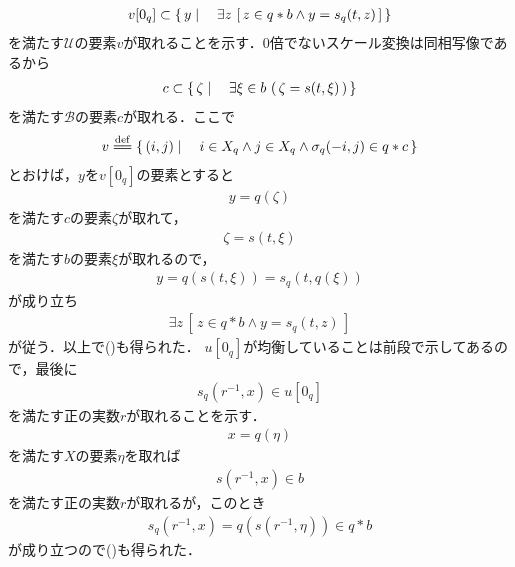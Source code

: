 \begin{sketch}
\begin{description}
				\begin{align}
					v[0_q] \subset \left\{\, y \mid \quad \exists z\, \left[\, z \in q \ast b \wedge y=s_q(t,z)\, \right]\, \right\}
					\label{fom:thm_quotient_topological_vector_space_3}
				\end{align}
				を満たす$\mathscr{U}$の要素$v$が取れることを示す．$0$倍でないスケール変換は同相写像であるから
				\begin{align}
					c \subset \left\{\, \zeta \mid \quad \exists \xi \in b\, \left(\, \zeta = s(t,\xi)\, \right)\, \right\}
				\end{align}
				を満たす$\mathscr{B}$の要素$c$が取れる．ここで
				\begin{align}
					v \defeq \Set{(i,j)}{i \in X_q \wedge j \in X_q \wedge \sigma_q(-i,j) \in q \ast c}
				\end{align}
				とおけば，$y$を$v[0_q]$の要素とすると
				\begin{align}
					y = q(\zeta)
				\end{align}
				を満たす$c$の要素$\zeta$が取れて，
				\begin{align}
					\zeta = s(t,\xi)
				\end{align}
				を満たす$b$の要素$\xi$が取れるので，
				\begin{align}
					y = q\left(s(t,\xi)\right) = s_q\left(t,q(\xi)\right)
				\end{align}
				が成り立ち
				\begin{align}
					\exists z\, \left[\, z \in q \ast b \wedge y=s_q(t,z)\, \right]
				\end{align}
				が従う．以上で()も得られた．
				$u[0_q]$が均衡していることは前段で示してあるので，最後に
				\begin{align}
					s_q(r^{-1},x) \in u[0_q]
					\label{fom:thm_quotient_topological_vector_space_4}
				\end{align}
				を満たす正の実数$r$が取れることを示す．
				\begin{align}
					x = q(\eta)
				\end{align}
				を満たす$X$の要素$\eta$を取れば
				\begin{align}
					s(r^{-1},x) \in b
				\end{align}
				を満たす正の実数$r$が取れるが，このとき
				\begin{align}
					s_q(r^{-1},x) = q\left(s(r^{-1},\eta)\right) \in q \ast b
				\end{align}
				が成り立つので()も得られた．
				

\end{description}
\end{sketch}
